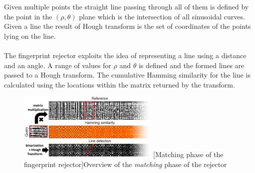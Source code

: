 Given multiple points the straight line passing through all of them is
defined by the point in the $(\rho, \theta)$ plane which is the intersection of
all sinusoidal curves. Given a line the result of Hough transform is the set of
coordinates of the points lying on the line.

\paragraph{}
The fingerprint rejector exploits the idea of representing a line using a
distance and an angle. A range of values for $\rho$ and $\theta$ is defined and
the formed lines are passed to a Hough transform. The cumulative Hamming
similarity for the line is calculated using the locations within the matrix
returned by the transform.

\begin{figure}[H]
    \centering
    \includegraphics[width=0.6\textwidth]{Algorithms/matchingcqt.png}
    \label{fig:matchingcqt}
    [Matching phase of the fingerprint rejector]{Overview of the \textit{matching} phase of the rejector}
\end{figure}
